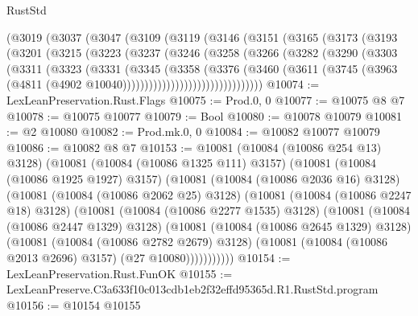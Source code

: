 \begin{lexlean}{RustStd}
\begin{coremodule}
    (@3019
      (@3037
        (@3047
          (@3109
            (@3119
              (@3146
                (@3151
                  (@3165
                    (@3173
                      (@3193
                        (@3201
                          (@3215
                            (@3223
                              (@3237
                                (@3246
                                  (@3258
                                    (@3266
                                      (@3282
                                        (@3290
                                          (@3303
                                            (@3311
                                              (@3323
                                                (@3331
                                                  (@3345
                                                    (@3358
                                                      (@3376
                                                        (@3460
                                                          (@3611
                                                            (@3745
                                                              (@3963
                                                                (@4811
                                                                  (@4902
                                                                    @10040))))))))))))))))))))))))))))))))
@10074 := LexLeanPreservation.Rust.Flags
@10075 := Prod.{0, 0}
@10077 := @10075 @8 @7
@10078 := @10075 @10077
@10079 := Bool
@10080 := @10078 @10079
@10081 := @2 @10080
@10082 := Prod.mk.{0, 0}
@10084 := @10082 @10077 @10079
@10086 := @10082 @8 @7
@10153 := @10081
    (@10084 (@10086 @254 @13) @3128)
    (@10081
      (@10084 (@10086 @1325 @111) @3157)
      (@10081
        (@10084 (@10086 @1925 @1927) @3157)
        (@10081
          (@10084 (@10086 @2036 @16) @3128)
          (@10081
            (@10084 (@10086 @2062 @25) @3128)
            (@10081
              (@10084 (@10086 @2247 @18) @3128)
              (@10081
                (@10084 (@10086 @2277 @1535) @3128)
                (@10081
                  (@10084 (@10086 @2447 @1329) @3128)
                  (@10081
                    (@10084 (@10086 @2645 @1329) @3128)
                    (@10081
                      (@10084 (@10086 @2782 @2679) @3128)
                      (@10081 (@10084 (@10086 @2013 @2696) @3157) (@27 @10080)))))))))))
@10154 := LexLeanPreservation.Rust.FunOK
@10155 := LexLeanPreserve.C3a633f10c013cdb1eb2f32effd95365d.R1.RustStd.program
@10156 := @10154 @10155

\end{coremodule}
\end{lexlean}
